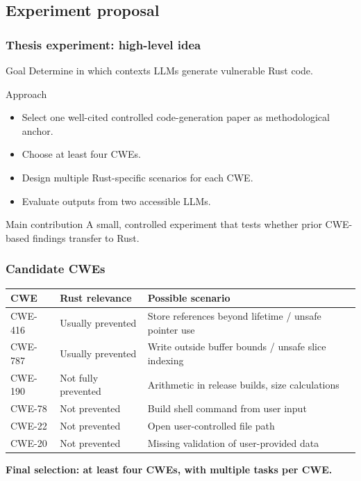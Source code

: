 
\subsection{Experiment proposal}

\begin{frame}
\frametitle{Thesis experiment: high-level idea}

\begin{alertblock}{Goal}
Determine in which contexts LLMs generate vulnerable Rust code.
\end{alertblock}

\medskip

\begin{block}{Approach}
\begin{itemize}
    \item Select one well-cited controlled code-generation paper as methodological anchor.
    \item Choose at least four CWEs.
    \item Design multiple Rust-specific scenarios for each CWE.
    \item Evaluate outputs from two accessible LLMs.
\end{itemize}
\end{block}

\medskip

\begin{exampleblock}{Main contribution}
A small, controlled experiment that tests whether prior CWE-based findings transfer to Rust.
\end{exampleblock}

\end{frame}


\begin{frame}
\frametitle{Candidate CWEs}

\begin{center}
\begin{tabular}{p{}p{}p{}}
\hline
\textbf{CWE} & \textbf{Rust relevance} & \textbf{Possible scenario} \\
\hline
CWE-416 & Usually prevented & Store references beyond lifetime / unsafe pointer use \\
CWE-787 & Usually prevented & Write outside buffer bounds / unsafe slice indexing \\
CWE-190 & Not fully prevented & Arithmetic in release builds, size calculations \\
CWE-78 & Not prevented & Build shell command from user input \\
CWE-22 & Not prevented & Open user-controlled file path \\
CWE-20 & Not prevented & Missing validation of user-provided data \\
\hline
\end{tabular}
\end{center}

\bigskip
\centering
\textbf{Final selection: at least four CWEs, with multiple tasks per CWE.}

\end{frame}

